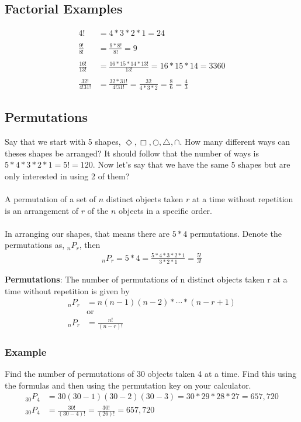 \documentclass[14pt]{extarticle}
\begin{document}
\subsection{Factorial Examples}
\begin{align*}
	4! &= 4*3*2*1 = 24 \\\\
	\frac{9!}{8!} &= \frac{9*8!}{8!} = 9 \\\\
	\frac{16!}{13!} &= \frac{16*15*14*13!}{13!}= 16*15*14 = 3360 \\\\
	\frac{32!}{4!31!} &= \frac{32*31!}{4!31!}= \frac{32}{4*3*2} = \frac{8}{6} = \frac{4}{3}
\end{align*}


\subsection{Permutations}
Say that we start with 5 shapes, $\Diamond, \Box, \bigcirc, \bigtriangleup, \cap$. How many different ways can theses shapes be arranged? It should follow that the number of ways is $5*4*3*2*1 = 5! = 120$. Now let's say that we have the same 5 shapes but are only interested in using 2 of them? 
\\\\
A permutation of a set of $n$ distinct objects taken $r$ at a time without repetition is an arrangement of $r$ of the $n$ objects in a specific order.
\\\\
In arranging our shapes, that means there are $5*4$ permutations. Denote the permutations as, $_nP_r$, then
\begin{align*}
	_nP_r = 5*4 = \frac{5*4*3*2*1}{3*2*1} = \frac{5!}{3!}
\end{align*}
\begin{tcolorbox}[enhanced jigsaw,colback=bg,boxrule=0pt,arc=0pt] 
	\textbf{Permutations}: The number of permutations of n distinct objects taken r at a time without repetition is given by
	\begin{align*}
		_nP_r &= n(n-1)(n-2)* \cdots *(n-r+1)\\
		&\text{or} \\
		_nP_r &= \frac{n!}{(n-r)!}
	\end{align*}
\end{tcolorbox}

\subsubsection{Example}
Find the number of permutations of 30 objects taken 4 at a time. Find this using the formulas and then using the permutation key on your calculator.
\begin{align*}
	_{30}P_4 &= 30(30-1)(30-2)(30-3) = 30*29*28*27 = 657,720 \\
	_{30}P_4 &= \frac{30!}{(30-4)!} = \frac{30!}{(26)!} = 657,720
\end{align*}
\end{document}
